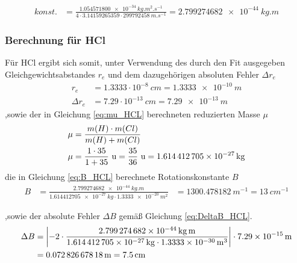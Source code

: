 \begin{align}
\label{eq:konst}
konst.&= 			 \frac{\SI[mode=math]{1.054571800e-34}{kg.m^2.s^{-1}}}{4\cdot 3.14159265359 \cdot \SI[mode=math]{299792458}{m.s^{-1}}}=\SI[mode=math]{2.799274682e-44}{kg.m}  				
\end{align}






\subsubsection*{Berechnung für HCl}
Für HCl ergibt sich somit, unter Verwendung des durch den Fit ausgegeben Gleichgewichtsabstandes $r_e$ und dem dazugehörigen absoluten Fehler $\Delta r_e$
\begin{align}
\label{eq:re_HCL}
r_e &= 1.3333 \cdot 10^{-8} ~\si{cm}=\SI[mode=math]{1.3333e-10}{m}
\\
\Delta r_e &= 7.29 \cdot 10^{-13} ~\si{cm}=\SI[mode=math]{7.29e-13}{m}
\end{align}
,sowie der in Gleichung \ref{eq:mu_HCL} berechneten reduzierten Masse $\mu$
\begin{align}
\mu&= \frac{m(H)\cdot m(Cl)}{m(H)+m(Cl)}\notag\\
\mu&= \frac{1\cdot35}{1+35} ~\si{u}=\frac{35}{36}~\si{u}=\SI[mode=math]{1.614412705e-27}{kg}\label{eq:mu_HCL}
\end{align}
die in Gleichung \ref{eq:B_HCL} berechnete Rotationskonstante $B$
\begin{align}
\label{eq:B_HCL}
B &=\frac{\SI[mode=math]{2.799274682e-44}{kg.m}}{\SI[mode=math]{1.614412705e-27}{kg}\cdot\SI[mode=math]{1.3333e-20}{m^{2}}}
&=\SI[mode=math]{1300.478182}{m^{-1}}
=\SI[mode=math]{13}{cm^{-1}}
\end{align}


,sowie der absolute Fehler $\Delta B$  gemäß Gleichung  \ref{eq:DeltaB_HCL}.  
\begin{align}
\Delta B &= \left|-2\cdot \frac{\SI[mode=math]{2.799274682e-44}{kg.m}}{\SI[mode=math]{1.614412705e-27}{kg}\cdot\SI[mode=math]{1.3333e-30}{m^{3}}}\right| \cdot \SI[mode=math]{7.29e-15}{m}
\notag\\
&=  \SI[mode=math]{0.07282667818}{m}= \SI[mode=math]{7.5}{cm} \label{eq:DeltaB_HCL}
\end{align} 







